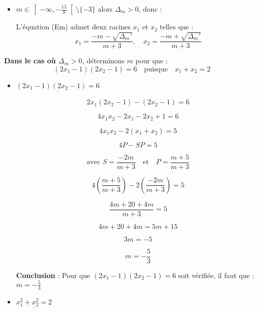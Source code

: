 \documentclass[12pt,a4paper]{article}
\begin{document}
\begin{enumerate}
\begin{itemize}
		\item \( m \in \left]-\infty, -\frac{15}{8} \right[ \setminus \{-3\} \) alors \( \Delta_m > 0 \), donc :

L'équation (Em) admet deux racines \(x_1\) et \(x_2\) telles que :
\[
x_1 = \frac{-m - \sqrt{\Delta_m'}}{m+3}, \quad x_2 = \frac{-m + \sqrt{\Delta_m'}}{m+3}
\]
\end{itemize}

\textbf{Dans le cas où \( \Delta_m > 0 \)}, déterminons \( m \) pour que :
\[
(2x_1 - 1)(2x_2 - 1) = 6 \quad \text{puisque} \quad x_1 + x_2 = 2
\]
\begin{itemize}

\item $ \underline{(2x_1 - 1)(2x_2 - 1) = 6} $

\[
2x_1 (2x_2 - 1) - (2x_2 - 1) = 6
\]

\[
4x_1 x_2 - 2x_1 - 2x_2 + 1 = 6
\]

\[
4x_1 x_2 - 2(x_1 + x_2) = 5
\]

\[
4P - SP = 5
\]

\[ \text{avec }
S = \frac{-2m}{m+3} \quad \text{et} \quad P = \frac{m+5}{m+3}
\]

\[
4 \left( \frac{m+5}{m+3} \right) - 2 \left( \frac{-2m}{m+3} \right) = 5
\]

\[
\frac{4m + 20 + 4m}{m+3} = 5
\]

\[
4m + 20 + 4m = 5m + 15
\]

\[
3m = -5
\]

\[
m = -\frac{5}{3}
\]

\textbf{Conclusion} :  
Pour que \( (2x_1 - 1)(2x_2 - 1) = 6 \) soit vérifiée, il faut que :
\(
m = -\frac{5}{3}
\)

\item $ \underline{x_1^{2} + x_2^{2} = 2} $

\end{itemize}
\end{enumerate}
\end{document}
